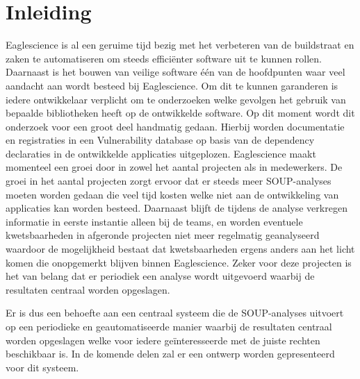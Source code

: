 \chapter{Inleiding}\label{ch:impl-inleiding}
Eaglescience is al een geruime tijd bezig met het verbeteren van de buildstraat en zaken te automatiseren om steeds efficiënter software uit te kunnen rollen. Daarnaast is het bouwen van veilige software één van de hoofdpunten waar veel aandacht aan wordt besteed bij Eaglescience. Om dit te kunnen garanderen is iedere ontwikkelaar verplicht om te onderzoeken welke gevolgen het gebruik van bepaalde bibliotheken heeft op de ontwikkelde software. Op dit moment wordt dit onderzoek voor een groot deel handmatig gedaan. Hierbij worden documentatie en registraties in een Vulnerability database op basis van de dependency declaraties in de ontwikkelde applicaties uitgeplozen.
Eaglescience maakt momenteel een groei door in zowel het aantal projecten als in medewerkers. De groei in het aantal projecten zorgt ervoor dat er steeds meer SOUP-analyses moeten worden gedaan die veel tijd kosten welke niet aan de ontwikkeling van applicaties kan worden besteed. Daarnaast blijft de tijdens de analyse verkregen informatie in eerste instantie alleen bij de teams, en worden eventuele kwetsbaarheden in afgeronde projecten niet meer regelmatig geanalyseerd waardoor de mogelijkheid bestaat dat kwetsbaarheden ergens anders aan het licht komen die onopgemerkt blijven binnen Eaglescience. Zeker voor deze projecten is het van belang dat er periodiek een analyse wordt uitgevoerd waarbij de resultaten centraal worden opgeslagen.

Er is dus een behoefte aan een centraal systeem die de SOUP-analyses uitvoert op een periodieke en geautomatiseerde manier waarbij de resultaten centraal worden opgeslagen welke voor iedere geïnteresseerde met de juiste rechten beschikbaar is. In de komende delen zal er een ontwerp worden gepresenteerd voor dit systeem.
